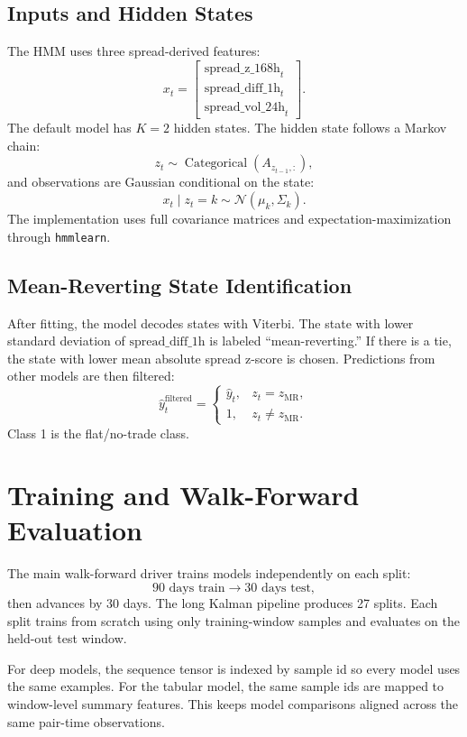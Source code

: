 \documentclass[11pt]{article}
\begin{document}
\subsection{Inputs and Hidden States}

The HMM uses three spread-derived features:
\[
x_t =
\begin{bmatrix}
\text{spread\_z\_168h}_t\\
\text{spread\_diff\_1h}_t\\
\text{spread\_vol\_24h}_t
\end{bmatrix}.
\]
The default model has \(K=2\) hidden states. The hidden state follows a Markov
chain:
\[
z_t \sim \operatorname{Categorical}(A_{z_{t-1},:}),
\]
and observations are Gaussian conditional on the state:
\[
x_t \mid z_t=k \sim \mathcal{N}(\mu_k,\Sigma_k).
\]
The implementation uses full covariance matrices and expectation-maximization
through \texttt{hmmlearn}.

\subsection{Mean-Reverting State Identification}

After fitting, the model decodes states with Viterbi. The state with lower
standard deviation of \(\text{spread\_diff\_1h}\) is labeled
``mean-reverting.'' If there is a tie, the state with lower mean absolute
spread z-score is chosen. Predictions from other models are then filtered:
\[
\hat{y}^{\text{filtered}}_t =
\begin{cases}
\hat{y}_t, & z_t = z_{\text{MR}},\\
1, & z_t \neq z_{\text{MR}}.
\end{cases}
\]
Class 1 is the flat/no-trade class.

\section{Training and Walk-Forward Evaluation}

The main walk-forward driver trains models independently on each split:
\[
90 \text{ days train} \rightarrow 30 \text{ days test},
\]
then advances by 30 days. The long Kalman pipeline produces 27 splits. Each
split trains from scratch using only training-window samples and evaluates on
the held-out test window.

For deep models, the sequence tensor is indexed by sample id so every model
uses the same examples. For the tabular model, the same sample ids are mapped
to window-level summary features. This keeps model comparisons aligned across
the same pair-time observations.
\end{document}
